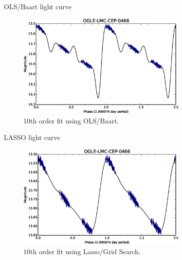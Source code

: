 \documentclass{beamer}
\begin{document}
\begin{frame}{OLS/Baart light curve}
  \begin{figure}[ht]
    \centering
    \includegraphics[width=0.75\textwidth]{img/lightcurve-ols}
    \caption*{$10$th order fit using OLS/Baart.}
  \end{figure}
\end{frame}

\begin{frame}{LASSO light curve}
  \begin{figure}[ht]
    \centering
    \includegraphics[width=0.75\textwidth]{img/lightcurve-lasso}
    \caption*{$10$th order fit using Lasso/Grid Search.}
  \end{figure}
\end{frame}
\end{document}
